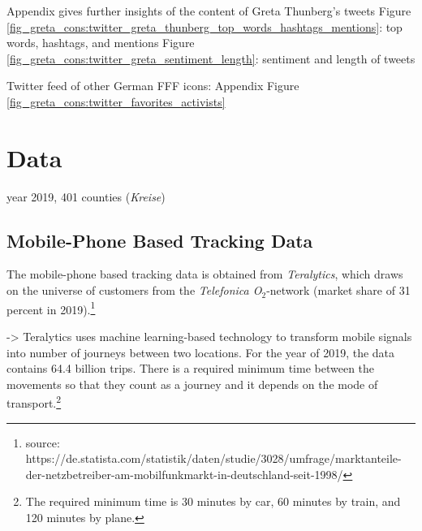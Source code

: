 \restoregeometry








Appendix gives further insights of the content of Greta Thunberg's tweets
Figure \ref{fig_greta_cons:twitter_greta_thunberg_top_words_hashtags_mentions}: top words, hashtags, and mentions
Figure \ref{fig_greta_cons:twitter_greta_sentiment_length}: sentiment and length of tweets


Twitter feed of other German FFF icons: Appendix Figure \ref{fig_greta_cons:twitter_favorites_activists}
















\newpage
\section{Data}\label{sec_greta_cons:data} 

year 2019, 401 counties (\textit{Kreise})



\subsection{Mobile-Phone Based Tracking Data}

The mobile-phone based tracking data is obtained from \textit{Teralytics}, which draws on the universe of customers from the \textit{Telefonica O$_2$}-network (market share of 31 percent in 2019).\footnote{source: https://de.statista.com/statistik/daten/studie/3028/umfrage/marktanteile-der-netzbetreiber-am-mobilfunkmarkt-in-deutschland-seit-1998/} 

->
Teralytics uses machine learning-based technology to transform mobile signals into number of journeys between two locations. For the year of 2019, the data contains 64.4 billion trips. There is a required minimum time between the movements so that they count as a journey and it depends on the mode of transport.\footnote{The required minimum time is 30 minutes by car, 60 minutes by train, and 120 minutes by plane.} 


